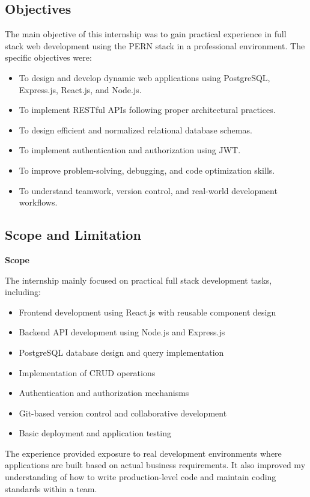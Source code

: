 \subsection{Objectives}

The main objective of this internship was to gain practical experience in full stack web development using the PERN stack in a professional environment. The specific objectives were:

\begin{itemize}
  \item To design and develop dynamic web applications using PostgreSQL, Express.js, React.js, and Node.js.
  \item To implement RESTful APIs following proper architectural practices.
  \item To design efficient and normalized relational database schemas.
  \item To implement authentication and authorization using JWT.
  \item To improve problem-solving, debugging, and code optimization skills.
  \item To understand teamwork, version control, and real-world development workflows.
\end{itemize}

\subsection{Scope and Limitation}

\textbf{Scope}

The internship mainly focused on practical full stack development tasks, including:

\begin{itemize}
  \item Frontend development using React.js with reusable component design
  \item Backend API development using Node.js and Express.js
  \item PostgreSQL database design and query implementation
  \item Implementation of CRUD operations
  \item Authentication and authorization mechanisms
  \item Git-based version control and collaborative development
  \item Basic deployment and application testing
\end{itemize}

The experience provided exposure to real development environments where applications are built based on actual business requirements. It also improved my understanding of how to write production-level code and maintain coding standards within a team.

